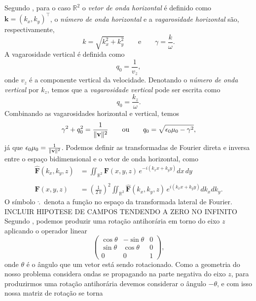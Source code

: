 Segundo \cite{White_Zhou_2006}, para o caso $\mathbb{R}^2$ o \textit{vetor de onda horizontal} \'e definido como $\mathbf{k}=(k_x,k_y)^\top$, o \textit{n\'umero de onda horizontal} e a \textit{vagarosidade horizontal} s\~ao, respectivamente,
\begin{equation}\label{eq.numero_onda_vagarozidade_horizontal}
k=\sqrt{k_x^2+k_y^2}\qquad\text{e}\qquad\gamma=\frac{k}{\omega}.
\end{equation}
A vagarosidade vertical \'e definida como
\begin{equation}
q_0=\frac{1}{v_z},
\end{equation}
onde $v_z$ \'e a componente vertical da velocidade. Denotando o \textit{n\'umero de onda vertical} por $k_z$, temos que a \textit{vagarosidade vertical} pode ser escrita como
\begin{equation}
q_0=\frac{k_z}{\omega}.
\end{equation}
Combinando as vagarosidades horizontal e vertical, temos
\begin{equation}\label{eq.vagarosidade_vertical}
\gamma^2+q_0^2=\frac{1}{\lVert\mathbf{v}\rVert^2}\qquad\text{ou}\qquad q_0=\sqrt{\epsilon_0\mu_0-\gamma^2},
\end{equation}
j\'a que $\epsilon_0\mu_0=\frac{1}{\lVert\mathbf{v}\rVert^2}$.
Podemos definir as transformadas de Fourier direta e inversa entre o espa\c{c}o bidimensional e o vetor de onda horizontal, como
\begin{align}\label{eq.trans_fourier_1}
\mathbf{\widehat{F}}(k_x,k_y,z) &= \iint_{\mathbb{R}^2}\mathbf{F}(x,y,z)\,e^{-i(k_xx+k_yy)}dx\,dy\\\nonumber\\\label{eq.trans_fourier_2}
\mathbf{F}(x,y,z) &= \left(\frac{1}{2\,\pi}\right)^2\iint_{\mathbb{R}^2}\mathbf{\widehat{F}}(k_x,k_y,z)\,e^{i(k_xx+k_yy)}dk_xdk_y.
\end{align}
O s\'imbolo $\,\widehat{.}\,$ denota a fun\c{c}\~ao no espa\c{c}o da transformada lateral de Fourier.
INCLUIR HIPOTESE DE CAMPOS TENDENDO A ZERO NO INFINITO
Segundo \cite{lang_1986}, podemos produzir uma rota\c{c}\~ao antihor\'aria em torno do eixo $z$ aplicando o operador linear
\begin{equation*}
\begin{pmatrix}
\cos\theta&-\sin\theta&0\\
\sin\theta&\cos\theta&0\\
0&0&1
\end{pmatrix},
\end{equation*}
onde $\theta$ \'e o \^angulo que um vetor est\'a sendo rotacionado. Como a geometria do nosso problema considera ondas se propagando na parte negativa do eixo $z$, para produzirmos uma rota\c{c}\~ao antihor\'aria devemos considerar o \^angulo $-\theta$, e com isso nossa matriz de rota\c{c}\~ao se torna
